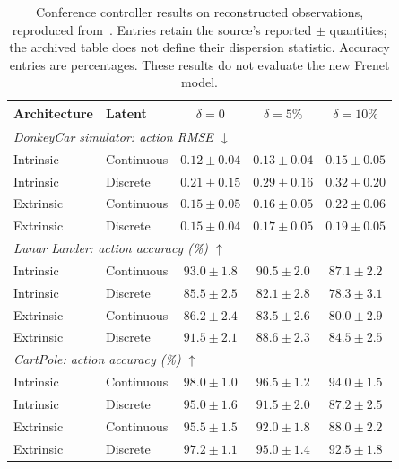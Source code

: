 \documentclass[preprint,12pt]{elsarticle}
\begin{document}
\begin{table}[htbp]
\centering
\caption{Conference controller results on reconstructed observations, reproduced
from~\cite{piwm_conf}. Entries retain the source's reported $\pm$ quantities;
the archived table does not define their dispersion statistic. Accuracy entries
are percentages. These results do not evaluate the new Frenet model.}
\label{tab:conf_control}
\small
\setlength{\tabcolsep}{5pt}
\begin{tabular}{@{}llccc@{}}
\toprule
Architecture & Latent & $\delta=0$ & $\delta=5\%$ & $\delta=10\%$ \\
\midrule
\multicolumn{5}{l}{\textit{DonkeyCar simulator: action RMSE $\downarrow$}}\\[2pt]
Intrinsic & Continuous & $0.12\pm0.04$ & $0.13\pm0.04$ & $0.15\pm0.05$\\
Intrinsic & Discrete   & $0.21\pm0.15$ & $0.29\pm0.16$ & $0.32\pm0.20$\\
Extrinsic & Continuous & $0.15\pm0.05$ & $0.16\pm0.05$ & $0.22\pm0.06$\\
Extrinsic & Discrete   & $0.15\pm0.04$ & $0.17\pm0.05$ & $0.19\pm0.05$\\
\midrule
\multicolumn{5}{l}{\textit{Lunar Lander: action accuracy (\%) $\uparrow$}}\\[2pt]
Intrinsic & Continuous & $93.0\pm1.8$ & $90.5\pm2.0$ & $87.1\pm2.2$\\
Intrinsic & Discrete   & $85.5\pm2.5$ & $82.1\pm2.8$ & $78.3\pm3.1$\\
Extrinsic & Continuous & $86.2\pm2.4$ & $83.5\pm2.6$ & $80.0\pm2.9$\\
Extrinsic & Discrete   & $91.5\pm2.1$ & $88.6\pm2.3$ & $84.5\pm2.5$\\
\midrule
\multicolumn{5}{l}{\textit{CartPole: action accuracy (\%) $\uparrow$}}\\[2pt]
Intrinsic & Continuous & $98.0\pm1.0$ & $96.5\pm1.2$ & $94.0\pm1.5$\\
Intrinsic & Discrete   & $95.0\pm1.6$ & $91.5\pm2.0$ & $87.2\pm2.5$\\
Extrinsic & Continuous & $95.5\pm1.5$ & $92.0\pm1.8$ & $88.0\pm2.2$\\
Extrinsic & Discrete   & $97.2\pm1.1$ & $95.0\pm1.4$ & $92.5\pm1.8$\\
\bottomrule
\end{tabular}
\end{table}



\end{document}
